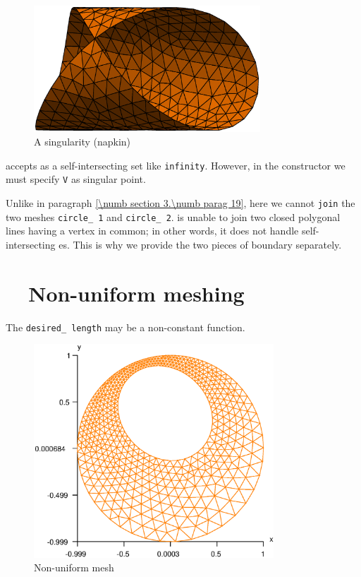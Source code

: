 \begin{figure}[ht] \centering
 \includegraphics[width=85mm]{cyl}
  \caption{A singularity (napkin)}
  \label{\numb section 3.\numb fig 9}
\end{figure}

{\ManiFEM} accepts as {\small\tt {}} a self-intersecting set like {\small\tt infinity}.
However, in the {\small\tt {}} constructor we must specify {\small\tt V} as singular point.

Unlike in paragraph \ref{\numb section 3.\numb parag 19}, here we cannot {\small\tt join} the
two meshes {\small\tt circle\_\,1} and {\small\tt circle\_\,2}.
{\ManiFEM} is unable to join two closed polygonal lines having a vertex in common;
in other words, it does not handle self-intersecting {\small\tt {}}es.
This is why we provide the two pieces of boundary separately.


\section{~~Non-uniform meshing}\label{\numb section 3.\numb parag 22}

The {\small\tt desired\_\,length} may be a non-constant function.

\begin{figure}[ht] \centering
 \includegraphics[width=90mm]{disk-non-unif}
  \caption{Non-uniform mesh}
  \label{\numb section 3.\numb fig 10}
\end{figure}

